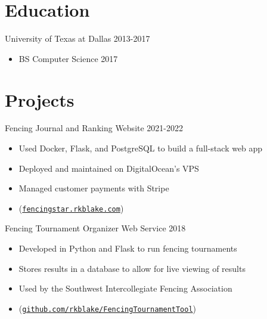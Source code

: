 \documentclass[line,margin]{res}
\begin{document}
\begin{resume}
\begin{itemize}
\end{itemize}

\section{Education}
\vspace{12pt}
University of Texas at Dallas \hfill 2013-2017 \\
\vspace{-12pt}
\begin{itemize} \itemsep -2pt
	\item BS Computer Science 2017
\end{itemize}

\vspace{-4pt}
\section{Projects}
\vspace{12pt}

Fencing Journal and Ranking Website
\hfill 2021-2022
	\begin{itemize} \itemsep -2pt
		\item Used Docker, Flask, and PostgreSQL to build a full-stack web app
		\item Deployed and maintained on DigitalOcean's VPS
		\item Managed customer payments with Stripe
		\item (\href{https://fencingstar.rkblake.com}{\texttt{fencingstar.rkblake.com}})
	\end{itemize}

\vspace{-8pt}
Fencing Tournament Organizer Web Service
\hfill 2018
	\begin{itemize} \itemsep -2pt
		\item Developed in Python and Flask to run fencing tournaments
		\item Stores results in a database to allow for live viewing of results
		\item Used by the Southwest Intercollegiate Fencing Association
		\item (\href{https://github.com/rkblake/FencingTournamentTool}{\texttt{github.com/rkblake/FencingTournamentTool}})
	\end{itemize}


\end{resume}
\end{document}
